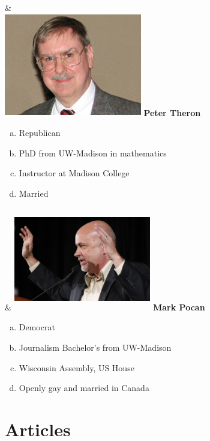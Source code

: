 \documentclass[twoside]{article}
\begin{document}
\begin{center}
\begin{tabu}
 & \\
  \includegraphics[width=6cm,height=4.5cm]{images/profiles/theron.jpg}
 \vskip0.5cm
 {\bfseries\Large Peter Theron}
 \begin{enumerate}[a)]
\item Republican
\item PhD from UW-Madison in mathematics
\item Instructor at Madison College
\item Married
 \end{enumerate}
 &
 \includegraphics[width=6cm,height=4.5cm]{images/profiles/pocan.jpg}
  \vskip0.5cm
 {\bfseries\Large Mark Pocan}
 \begin{enumerate}[a)]
\item Democrat
\item Journalism Bachelor's from UW-Madison
\item Wisconsin Assembly, US House
\item Openly gay and married in Canada
 \end{enumerate}
\end{tabu}
\end{center}
\newpage
\section{Articles}
\end{document}
